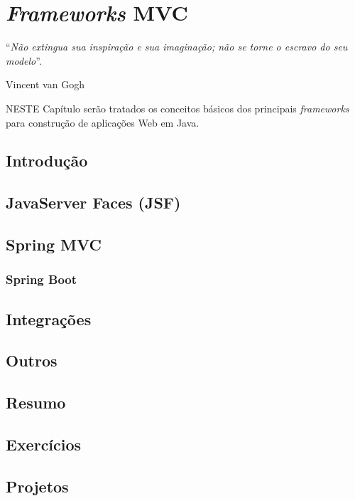 \chapter{\textit{Frameworks} MVC}\label{cap:frameworksMVC}
\epigraph{``\textit{Não extingua sua inspiração e sua imaginação; não se torne o escravo do seu modelo}''.}{Vincent van Gogh}

\lettrine[lines=4, lhang=0.1, lraise=0, loversize=0.2, findent=0.1em]{\textcolor{corAzulTema}{N}}{ESTE} Capítulo serão tratados os conceitos básicos dos principais \textit{frameworks} para construção de aplicações Web em Java.

\vfill

\section{Introdução}

\section{JavaServer Faces (JSF)}

\section{Spring MVC}

\subsection{Spring Boot}

\section{Integrações}

\section{Outros}


\section{Resumo}

\section{Exercícios}

\section{Projetos}
